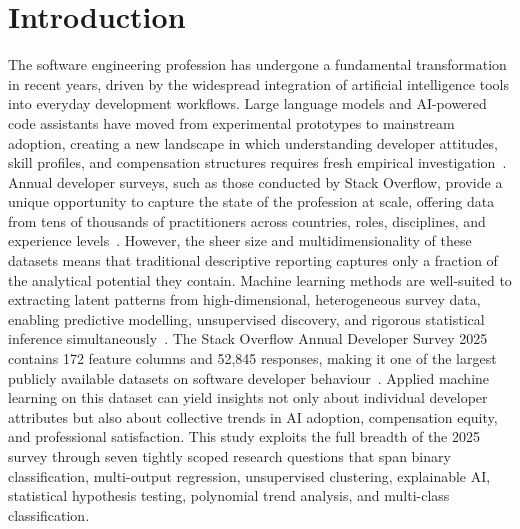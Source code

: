 \documentclass[journal, onecolumn]{IEEEtran}
\begin{document}
\section{Introduction}

The software engineering profession has undergone a fundamental transformation in recent years, driven by the widespread integration of artificial intelligence tools into everyday development workflows.
Large language models and AI-powered code assistants have moved from experimental prototypes to mainstream adoption, creating a new landscape in which understanding developer attitudes, skill profiles, and compensation structures requires fresh empirical investigation~\cite{hou2023large}.
Annual developer surveys, such as those conducted by Stack Overflow, provide a unique opportunity to capture the state of the profession at scale, offering data from tens of thousands of practitioners across countries, roles, disciplines, and experience levels~\cite{stackoverflow2025survey}.
However, the sheer size and multidimensionality of these datasets means that traditional descriptive reporting captures only a fraction of the analytical potential they contain.
Machine learning methods are well-suited to extracting latent patterns from high-dimensional, heterogeneous survey data, enabling predictive modelling, unsupervised discovery, and rigorous statistical inference simultaneously~\cite{breiman2001random}.
The Stack Overflow Annual Developer Survey 2025 contains 172 feature columns and 52,845 responses, making it one of the largest publicly available datasets on software developer behaviour~\cite{stackoverflow2025survey}.
Applied machine learning on this dataset can yield insights not only about individual developer attributes but also about collective trends in AI adoption, compensation equity, and professional satisfaction.
This study exploits the full breadth of the 2025 survey through seven tightly scoped research questions that span binary classification, multi-output regression, unsupervised clustering, explainable AI, statistical hypothesis testing, polynomial trend analysis, and multi-class classification.
\end{document}
